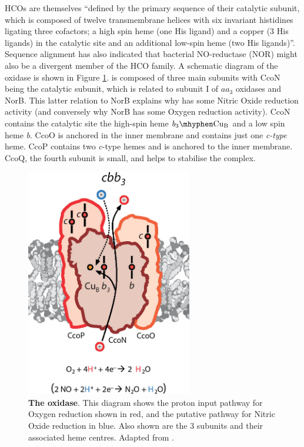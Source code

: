 HCOs are themselves ``defined by the primary sequence of their catalytic subunit, which is composed of twelve transmembrane helices with six invariant histidines ligating three cofactors; a high spin heme (one His ligand) and a copper (3 His ligands) in the catalytic site and an additional low-spin heme (two His ligands)''\cite{Huang2010}. Sequence alignment has also indicated that bacterial NO-reductase (NOR) might also be a divergent member of the HCO family. A schematic diagram of the \cbbthree{} oxidase is shown in Figure \ref{fig:cbb3}. \cbbthree{} is composed of three main subunits with CcoN being the catalytic subunit, which is related to subunit I of $\mathit{aa}_3$ oxidases and NorB. This latter relation to NorB explains why \cbbthree{} has some Nitric Oxide reduction activity (and conversely why NorB has some Oxygen reduction activity)\cite{Huang2010}. CcoN contains the catalytic site \textendash{} the high-spin heme $\mathit{b}_3\mhyphen\mathrm{Cu}_{\mathrm{B}}$ \textendash{} and a low spin heme \textit{b}. CcoO is anchored in the inner membrane and contains just one \textit{c-type} heme. CcoP contains two \textit{c}-type hemes and is anchored to the inner membrane. CcoQ, the fourth subunit is small, and helps to stabilise the complex\cite{Huang2010}.

\begin{figure}[tbp]
	\begin{center}
		\includegraphics[height=10cm]{01-introduction/data/cbb3_only.png}
	\end{center}
	\caption[{The \cbbthree{} oxidase}.]{{\bf The \cbbthree{} oxidase}. This diagram shows the proton input pathway for Oxygen reduction shown in red, and the putative pathway for Nitric Oxide reduction in blue. Also shown are the 3 subunits and their associated heme centres. Adapted from \citet{Huang2010}.
	\label{fig:cbb3}}
\end{figure}

